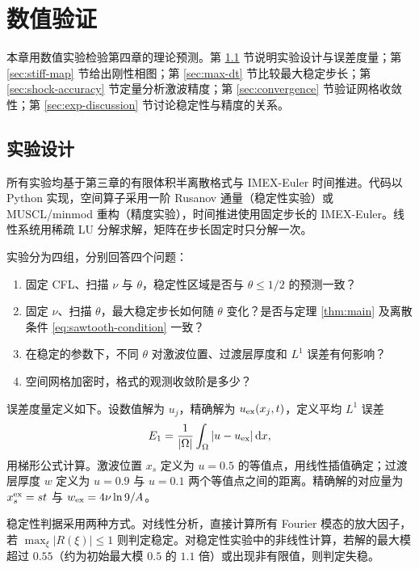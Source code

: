 \chapter{数值验证}

本章用数值实验检验第四章的理论预测。第 \ref{sec:exp-design} 节说明实验设计与误差度量；第 \ref{sec:stiff-map} 节给出刚性相图；第 \ref{sec:max-dt} 节比较最大稳定步长；第 \ref{sec:shock-accuracy} 节定量分析激波精度；第 \ref{sec:convergence} 节验证网格收敛性；第 \ref{sec:exp-discussion} 节讨论稳定性与精度的关系。

\section{实验设计}
\label{sec:exp-design}

所有实验均基于第三章的有限体积半离散格式与 IMEX-Euler 时间推进。代码以 Python 实现，空间算子采用一阶 Rusanov 通量（稳定性实验）或 MUSCL/minmod 重构（精度实验），时间推进使用固定步长的 IMEX-Euler。线性系统用稀疏 LU 分解求解，矩阵在步长固定时只分解一次。

实验分为四组，分别回答四个问题：
\begin{enumerate}[label=(\arabic*),leftmargin=2.4em]
  \item 固定 CFL、扫描 $\nu$ 与 $\theta$，稳定性区域是否与 $\theta\le1/2$ 的预测一致？
  \item 固定 $\nu$、扫描 $\theta$，最大稳定步长如何随 $\theta$ 变化？是否与定理 \ref{thm:main} 及离散条件 \eqref{eq:sawtooth-condition} 一致？
  \item 在稳定的参数下，不同 $\theta$ 对激波位置、过渡层厚度和 $L^1$ 误差有何影响？
  \item 空间网格加密时，格式的观测收敛阶是多少？
\end{enumerate}

误差度量定义如下。设数值解为 $u_j$，精确解为 $u_{\rm ex}(x_j,t)$，定义平均 $L^1$ 误差
\begin{equation}
  E_1=\frac{1}{|\Omega|}\int_\Omega|u-u_{\rm ex}|\,\mathrm{d} x,
  \label{eq:L1-error}
\end{equation}
用梯形公式计算。激波位置 $x_s$ 定义为 $u=0.5$ 的等值点，用线性插值确定；过渡层厚度 $w$ 定义为 $u=0.9$ 与 $u=0.1$ 两个等值点之间的距离。精确解的对应量为 $x_s^{\rm ex}=st$ 与 $w_{\rm ex}=4\nu\ln9/A$。

稳定性判据采用两种方式。对线性分析，直接计算所有 Fourier 模态的放大因子，若 $\max_\xi|R(\xi)|\le1$ 则判定稳定。对稳定性实验中的非线性计算，若解的最大模超过 $0.55$（约为初始最大模 $0.5$ 的 $1.1$ 倍）或出现非有限值，则判定失稳。

